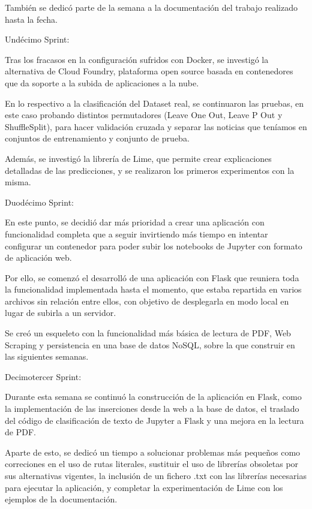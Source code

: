 También se dedicó parte de la semana a la documentación del trabajo realizado hasta la fecha.

Undécimo Sprint:

Tras los fracasos en la configuración sufridos con Docker, se investigó la alternativa de Cloud Foundry, plataforma open source basada en contenedores que da soporte a la subida de aplicaciones a la nube.

En lo respectivo a la clasificación del Dataset real, se continuaron las pruebas, en este caso probando distintos permutadores (Leave One Out, Leave P Out y ShuffleSplit), para hacer validación cruzada y separar las noticias que teníamos en conjuntos de entrenamiento y conjunto de prueba. 

Además, se investigó la librería de Lime, que permite crear explicaciones detalladas de las predicciones, y se realizaron los primeros experimentos con la misma.

Duodécimo Sprint:

En este punto, se decidió dar más prioridad a crear una aplicación con funcionalidad completa que a seguir invirtiendo más tiempo en intentar configurar un contenedor para poder subir los notebooks de Jupyter con formato de aplicación web. 

Por ello, se comenzó el desarrolló de una aplicación con Flask que reuniera toda la funcionalidad implementada hasta el momento, que estaba repartida en varios archivos sin relación entre ellos, con objetivo de desplegarla en modo local en lugar de subirla a un servidor. 

Se creó un esqueleto con la funcionalidad más básica de lectura de PDF, Web Scraping y persistencia en una base de datos NoSQL, sobre la que construir en las siguientes semanas.

Decimotercer Sprint:

Durante esta semana se continuó la construcción de la aplicación en Flask, como la implementación de las inserciones desde la web a la base de datos, el traslado del código de clasificación de texto de Jupyter a Flask y una mejora en la lectura de PDF.

Aparte de esto, se dedicó un tiempo a solucionar problemas más pequeños como correciones en el uso de rutas literales, sustituir el uso de librerías obsoletas por sus alternativas vigentes, la inclusión de un fichero .txt con las librerías necesarias para ejecutar la aplicación, y completar la experimentación de Lime con los ejemplos de la documentación.

